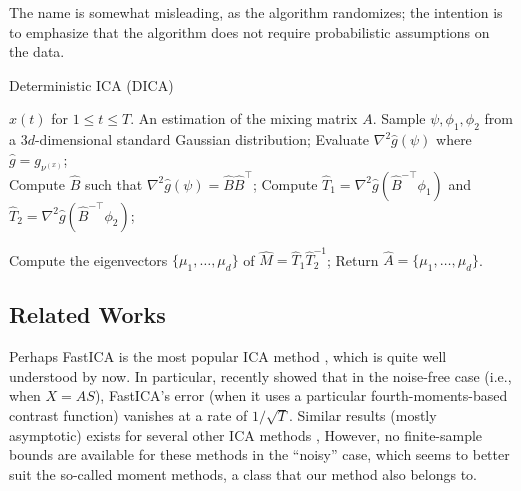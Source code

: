 \documentclass{article} %
\theoremstyle{definition}
\begin{document}
The name is somewhat misleading, as the algorithm randomizes; the intention is to emphasize that the algorithm does not require probabilistic assumptions on the data.
\begin{algorithm}
\caption{Deterministic ICA (DICA)}
\label{alg:DICA}
\begin{algorithmic}[1]
\INPUT $x(t)$ for $1\le t \le T$. 
\OUTPUT An estimation of the mixing matrix $A$. 
\STATE Sample $\psi, \phi_1, \phi_2$ from a $3d$-dimensional standard Gaussian distribution;
\STATE Evaluate $\nabla^2 \hat{g}(\psi)$ where $\hat{g} = g_{\nu^{(x)}}$; \\
\STATE Compute $\hat{B}$ such that $\nabla^2\hat{g}(\psi) = \hat{B}\hat{B}^{\top}$;
\STATE Compute $\hat{T}_1 =\nabla^2\hat{g}(\hat{B}^{-\top}\phi_1)$ and  $\hat{T}_2 =\nabla^2\hat{g}(\hat{B}^{-\top}\phi_2)$;

\STATE Compute the eigenvectors $\{\mu_1,\ldots,\mu_d\}$ of $\hat{M} = \hat{T}_1\hat{T}_2^{-1}$;
\STATE Return $\hat{A} = \{\mu_1,\ldots,\mu_d\}$.
\end{algorithmic}
\end{algorithm}
\vspace*{-0.2in}
\subsection{Related Works}
\label{subsec:relatedWorks}
Perhaps FastICA is the most popular ICA method  \citep{hyvarinen1999fast}, which is quite well understood by now.
In particular, recently \citet{miettinen2014fourth} showed that in the noise-free case (i.e., when $X = AS$), FastICA's error (when it uses a particular fourth-moments-based contrast function) vanishes at a rate of $1/\sqrt{T}$. %
Similar results (mostly asymptotic) exists for several other ICA methods
\citep[e.g.,][]{eriksson2003characteristic,samarov2004nonparametric,chen2005consistent,chen2006efficient},
However, no finite-sample bounds are available for these methods in the ``noisy'' case, which seems to better suit the so-called moment methods, a class that our method also belongs to.
\end{document}
